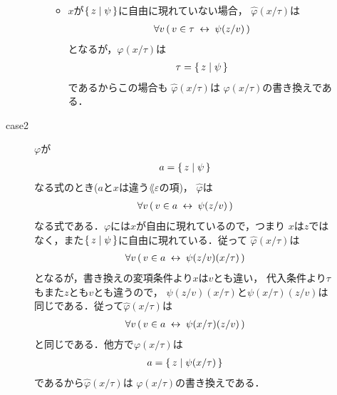 \begin{metaprf}[第一]
\begin{description}
\begin{description}
\begin{itemize}
\begin{itemize}
									\item $x$が$\{\, z \mid \psi\, \}$に自由に現れていない場合，
										$\widehat{\varphi}(x/\tau)$は
										\begin{align}
											\forall v\, (\, v \in \tau \hspace{0.25em}\leftrightarrow\hspace{0.25em} \psi(z/v)\, )
										\end{align}
										となるが，$\varphi(x/\tau)$は
										\begin{align}
											\tau = \{\, z \mid \psi\, \}
										\end{align}
										であるからこの場合も
										$\widehat{\varphi}(x/\tau)$は
										$\varphi(x/\tau)$の書き換えである．
								\end{itemize}
						\end{itemize}
						
					\item[case2] $\varphi$が
						\begin{align}
							a = \{\, z \mid \psi\, \}
						\end{align}
						なる式のとき($a$と$x$は違う$\lang{\varepsilon}$の項)，
						$\widehat{\varphi}$は
						\begin{align}
							\forall v\, (\, v \in a \hspace{0.25em}\leftrightarrow\hspace{0.25em} \psi(z/v)\, )
						\end{align}
						なる式である．$\varphi$には$x$が自由に現れているので，つまり
						$x$は$z$ではなく，また$\{\, z \mid \psi\, \}$に自由に現れている．従って
						$\widehat{\varphi}(x/\tau)$は
						\begin{align}
							\forall v\, (\, v \in a \hspace{0.25em}\leftrightarrow\hspace{0.25em} \psi(z/v)(x/\tau)\, )
						\end{align}
						となるが，書き換えの変項条件より$x$は$v$とも違い，
						代入条件より$\tau$もまた$z$とも$v$とも違うので，
						$\psi(z/v)(x/\tau)$と$\psi(x/\tau)(z/v)$は
						同じである．従って$\widehat{\varphi}(x/\tau)$は
						\begin{align}
							\forall v\, (\, v \in a \hspace{0.25em}\leftrightarrow\hspace{0.25em} \psi(x/\tau)(z/v)\, )
						\end{align}
						と同じである．他方で$\varphi(x/\tau)$は
						\begin{align}
							a = \{\, z \mid \psi(x/\tau)\, \}
						\end{align}
						であるから$\widehat{\varphi}(x/\tau)$は
						$\varphi(x/\tau)$の書き換えである．
					

\end{description}
\end{description}
\end{metaprf}
